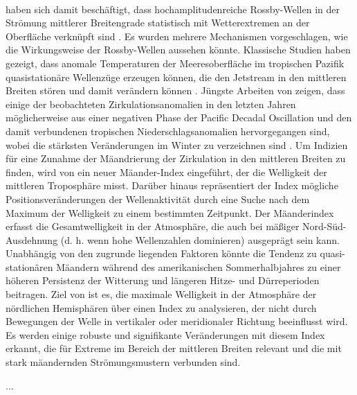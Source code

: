 \citet{dicapua-2016} \\
\citet{dicapua-2016} haben sich damit beschäftigt, dass hochamplitudenreiche Rossby-Wellen in der Strömung mittlerer Breitengrade statistisch mit Wetterextremen an der Oberfläche verknüpft sind \citep{} \citep{}. Es wurden mehrere Mechanismen vorgeschlagen, wie  die Wirkungsweise der Rossby-Wellen aussehen könnte. Klassische Studien haben gezeigt, dass anomale Temperaturen der Meeresoberfläche im tropischen Pazifik quasistationäre Wellenzüge erzeugen können, die den Jetstream in den mittleren Breiten stören und damit verändern können \citep{} \citep{}. Jüngste Arbeiten von \citet{trenberth-xxxx} zeigen, dass einige der beobachteten  Zirkulationsanomalien in den letzten Jahren möglicherweise aus einer negativen Phase der Pacific Decadal Oscillation und den damit verbundenen tropischen Niederschlagsanomalien hervorgegangen sind, wobei die stärksten Veränderungen im Winter zu verzeichnen sind \citep{}. Um Indizien für eine Zunahme der Mäandrierung der Zirkulation in den mittleren Breiten zu finden, wird von \citet{dicapua-2015} ein neuer Mäander-Index eingeführt, der die Welligkeit der mittleren Troposphäre misst. Darüber hinaus repräsentiert der Index mögliche Positionsveränderungen der Wellenaktivität durch eine Suche nach dem Maximum der Welligkeit zu einem bestimmten Zeitpunkt. Der Mäanderindex erfasst die Gesamtwelligkeit in der Atmosphäre, die auch bei mäßiger Nord-Süd-Ausdehnung (d. h. wenn hohe Wellenzahlen dominieren) ausgeprägt sein kann. Unabhängig von den zugrunde liegenden Faktoren könnte die Tendenz zu quasi-stationären Mäandern während des amerikanischen Sommerhalbjahres zu einer höheren Persistenz der Witterung und längeren Hitze- und Dürreperioden beitragen. Ziel von \citet{dicapua-2016} ist es, die maximale Welligkeit in der Atmosphäre der nördlichen Hemisphären über einen Index zu analysieren, der nicht durch Bewegungen der Welle in vertikaler oder meridionaler Richtung beeinflusst wird. Es werden einige robuste und signifikante Veränderungen mit diesem Index erkannt, die für Extreme im Bereich der mittleren Breiten relevant und die mit stark mäandernden Strömungsmustern verbunden sind.


...
\citep{barnes-2013-a}
\citep{cohen-2014}
\citep{chemke-2014}
\citep{coumou-2015}
\citep{kornhuber-2016}








